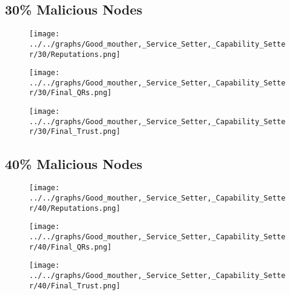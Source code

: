 \begin{minipage}[t]{0.49\columnwidth}
\subsection*{30\% Malicious Nodes}
    \begin{figure}[H]
        \centering
        \texttt{[image: ../../graphs/Good\_mouther,\_Service\_Setter,\_Capability\_Setter/30/Reputations.png]}
    \end{figure}
    \begin{figure}[H]
        \centering
        \texttt{[image: ../../graphs/Good\_mouther,\_Service\_Setter,\_Capability\_Setter/30/Final\_QRs.png]}
    \end{figure}
\end{minipage}
\begin{minipage}[t]{0.49\columnwidth}
    \begin{figure}[H]
        \centering
        \texttt{[image: ../../graphs/Good\_mouther,\_Service\_Setter,\_Capability\_Setter/30/Final\_Trust.png]}
    \end{figure}
\end{minipage}

\begin{minipage}[t]{0.49\columnwidth}
\subsection*{40\% Malicious Nodes}
    \begin{figure}[H]
        \centering
        \texttt{[image: ../../graphs/Good\_mouther,\_Service\_Setter,\_Capability\_Setter/40/Reputations.png]}
    \end{figure}
    \begin{figure}[H]
        \centering
        \texttt{[image: ../../graphs/Good\_mouther,\_Service\_Setter,\_Capability\_Setter/40/Final\_QRs.png]}
    \end{figure}
\end{minipage}
\begin{minipage}[t]{0.49\columnwidth}
    \begin{figure}[H]
        \centering
        \texttt{[image: ../../graphs/Good\_mouther,\_Service\_Setter,\_Capability\_Setter/40/Final\_Trust.png]}
    \end{figure}
\end{minipage}

